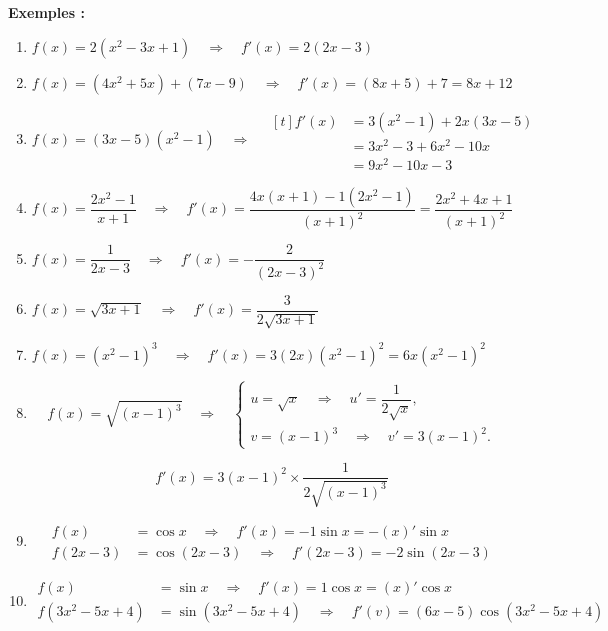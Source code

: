 \documentclass[12pt,a4paper]{article}
\begin{document}
\textbf{Exemples :}

\begin{enumerate}

    \item $f(x)=2(x^2-3x+1)
    \quad\Longrightarrow\quad
    f'(x)=2(2x-3)$

    \item $f(x)=(4x^2+5x)+(7x-9)
    \quad\Longrightarrow\quad
    f'(x)=(8x+5)+7=8x+12$

    \item $f(x)=(3x-5)(x^2-1)
    \quad\Longrightarrow\quad
    \begin{aligned}[t]
    f'(x)
    &=3(x^2-1)+2x(3x-5)\\
    &=3x^2-3+6x^2-10x\\
    &=9x^2-10x-3
    \end{aligned}$

    \item $f(x)=\dfrac{2x^2-1}{x+1}
    \quad\Longrightarrow\quad
    f'(x)=
    \dfrac{4x(x+1)-1(2x^2-1)}{(x+1)^2}
    =\dfrac{2x^2+4x+1}{(x+1)^2}$

    \item $f(x)=\dfrac{1}{2x-3}
    \quad\Longrightarrow\quad
    f'(x)=-\dfrac{2}{(2x-3)^2}$

    \item $f(x)=\sqrt{3x+1}
    \quad\Longrightarrow\quad
    f'(x)=\dfrac{3}{2\sqrt{3x+1}}$

    \item $f(x)=(x^2-1)^3
    \quad\Longrightarrow\quad
    f'(x)=3(2x)(x^2-1)^2
    =6x(x^2-1)^2$

    \item
    \[
    f(x)=\sqrt{(x-1)^3}
    \quad\Longrightarrow\quad
    \begin{cases}
        u=\sqrt{x} \quad\Longrightarrow\quad
        u'=\dfrac{1}{2\sqrt{x}},\\[2mm]
        v=(x-1)^3 \quad\Longrightarrow\quad
        v'=3(x-1)^2.
    \end{cases}
    \]

    \[
    f'(x)=3(x-1)^2\times
    \dfrac{1}{2\sqrt{(x-1)^3}}
    \]

    \item
    \[
    \begin{aligned}
    f(x)&=\cos x
    \quad\Longrightarrow\quad
    f'(x)=-1\sin x=-(x)'\sin x
    \\[2mm]
    f(2x-3)&=\cos(2x-3)
    \quad\Longrightarrow\quad
    f'(2x-3)=-2\sin(2x-3)
    \end{aligned}
    \]

    \item
    \[
    \begin{aligned}
    f(x)&=\sin x
    \quad\Longrightarrow\quad
    f'(x)=1\cos x=(x)'\cos x
    \\[2mm]
    f(3x^2-5x+4)&=\sin(3x^2-5x+4)
    \quad\Longrightarrow\quad
    f'(v)=(6x-5)\cos(3x^2-5x+4)
    \end{aligned}
    \]

\end{enumerate}
\end{document}
